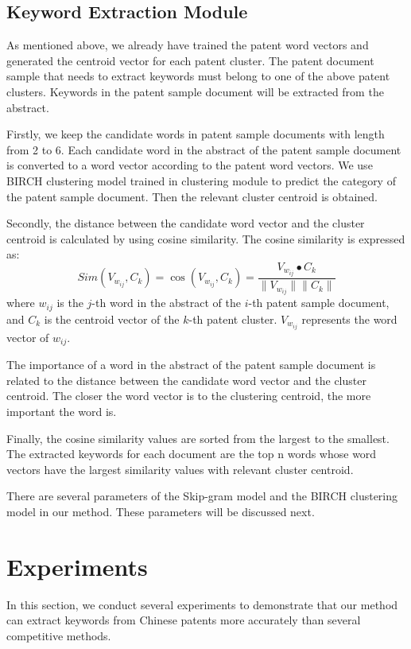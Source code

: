 \documentclass[conference]{IEEEtran}
\begin{document}
\begin{CJK}{UTF8}{gbsn}
	\subsection{Keyword Extraction Module}
	As mentioned above, we already have trained the patent word vectors and generated the centroid vector for each patent cluster. The patent document sample that needs to extract keywords must belong to one of the above patent clusters. Keywords in the patent sample document will be extracted from the abstract.
	
	Firstly, we keep the candidate words in patent sample documents with length from 2 to 6. Each candidate word in the abstract of the patent sample document is converted to a word vector according to the patent word vectors. We use BIRCH clustering model trained in clustering module to predict the category of the patent sample document. Then the relevant cluster centroid is obtained.
	
	Secondly, the distance between the candidate word vector and the cluster centroid is calculated by using cosine similarity. The cosine similarity is expressed as:
	\begin{equation}
	Sim(V_{w_{ij}},C_k)=\cos{(V_{w_{ij}},C_k)}=\frac{V_{w_{ij}}\bullet C_k}{\|V_{w_{ij}}\|\|C_k\|}\label{eq3}
	\end{equation}
	where $w_{ij}$ is the $j$-th word in the abstract of the $i$-th patent sample document, and $C_k$ is the centroid vector of the $k$-th patent cluster. $V_{w_{ij}}$ represents the word vector of $w_{ij}$.
	
	The importance of a word in the abstract of the patent sample document is related to the distance between the candidate word vector and the cluster centroid. The closer the word vector is to the clustering centroid, the more important the word is.
	
	Finally, the cosine similarity values are sorted from the largest to the smallest. The extracted keywords for each document are the top n words whose word vectors have the largest similarity values with relevant cluster centroid.
	
	There are several parameters of the Skip-gram model and the BIRCH clustering model in our method. These parameters will be discussed next.
	\section{Experiments}
	In this section, we conduct several experiments to demonstrate that our method can extract keywords from Chinese patents more accurately than several competitive methods. 
	

\end{CJK}
\end{document}
